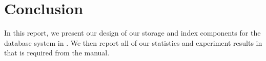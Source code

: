 \documentclass{article}
\begin{document}













\section{Conclusion}
In this report, we present our design of our storage and index components for the database system in . We then report all of our statistics and experiment results in  that is required from the manual.



\newpage
\appendix


\end{document}
